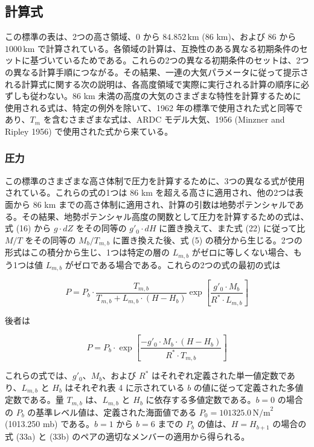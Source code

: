 \documentclass{article}
\begin{document}
\subsection{計算式}

この標準の表は、2つの高さ領域、$0$ から $84.852 \, \text{km}$ (86 km)、および $86$ から $1000 \, \text{km}$ で計算されている。各領域の計算は、互換性のある異なる初期条件のセットに基づいているためである。これらの2つの異なる初期条件のセットは、2つの異なる計算手順につながる。その結果、一連の大気パラメータに従って提示される計算式に関する次の説明は、各高度領域で実際に実行される計算の順序に必ずしも従わない。86 km 未満の高度の大気のさまざまな特性を計算するために使用される式は、特定の例外を除いて、1962 年の標準で使用された式と同等であり、$T_m$ を含むさまざまな式は、ARDC モデル大気、1956 (Minzner and Ripley 1956) で使用された式から来ている。

\subsubsection{圧力}

この標準のさまざまな高さ体制で圧力を計算するために、3つの異なる式が使用されている。これらの式の1つは 86 km を超える高さに適用され、他の2つは表面から 86 km までの高さ体制に適用され、計算の引数は地勢ポテンシャルである。その結果、地勢ポテンシャル高度の関数として圧力を計算するための式は、式 (16) から $g \cdot dZ$ をその同等の $g'_0 \cdot dH$ に置き換えて、また式 (22) に従って比 $M/T$ をその同等の $M_b/T_{m,b}$ に置き換えた後、式 (5) の積分から生じる。2つの形式はこの積分から生じ、1つは特定の層の $L_{m,b}$ がゼロに等しくない場合、もう1つは値 $L_{m,b}$ がゼロである場合である。これらの2つの式の最初の式は

\[
P = P_b \cdot \frac{T_{m,b}}{T_{m,b} + L_{m,b} \cdot (H - H_b)} \exp \left[ \frac{g'_0 \cdot M_b}{R^* \cdot L_{m,b}} \right] \tag{33a}
\]

後者は

\[
P = P_b \cdot \exp \left[ \frac{-g'_0 \cdot M_b \cdot (H - H_b)}{R^* \cdot T_{m,b}} \right] \tag{33b}
\]

これらの式では、$g'_0$、$M_b$、および $R^*$ はそれぞれ定義された単一値定数であり、$L_{m,b}$ と $H_b$ はそれぞれ表 4 に示されている $b$ の値に従って定義された多値定数である。量 $T_{m,b}$ は、$L_{m,b}$ と $H_b$ に依存する多値定数である。$b = 0$ の場合の $P_b$ の基準レベル値は、定義された海面値である $P_0 = 101325.0 \, \text{N/m}^2$ (1013.250 mb) である。$b = 1$ から $b = 6$ までの $P_b$ の値は、$H = H_{b+1}$ の場合の式 (33a) と (33b) のペアの適切なメンバーの適用から得られる。
\end{document}
